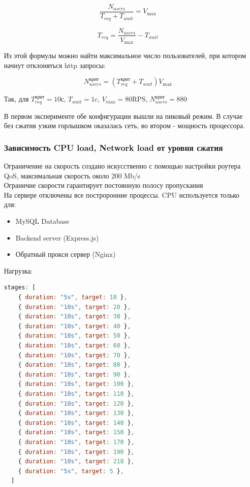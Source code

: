 \documentclass[12pt]{article}
\begin{document}
\[
    \frac{N_{users}}{T_{req} + T_{wait}}=V_{\text{max}}
\]

\[
    T_{req} = \frac{N_{users}}{V_{\text{max}}} - T_{wait}
\]

Из этой формулы можно найти максимальное число пользователей, при котором начнут отклоняться http запросы:

\begin{equation}
    N^{\text{крит}}_{users} = (T^{\text{крит}}_{req} + T_{wait}){V_{\text{max}}}
\end{equation}

Так, для $T^{\text{крит}}_{req} = 10$с, $T_{wait}=1$c, $V_{max}=80$RPS, $N^{\text{крит}}_{users}=880$

В первом эксперименте обе конфигурации вышли на пиковый режим. В случае без сжатия узким горлышком оказалась сеть, во втором - мощность процессора.

\subsubsection{Зависимость CPU load, Network load от уровня сжатия}

Ограничение на скорость создано искусственно с помощью настройки роутера QoS, максимальная скорость около 200 Mb/s\\
Ограничие скорости гарантирует постоянную полосу пропускания\\
На сервере отключены все построронние процессы. CPU используется только для:

\begin{itemize}
    \item MySQL Database
    \item Backend server (Express.js)
    \item Обратный прокси сервер (Nginx)
\end{itemize}

Нагрузка:

\begin{lstlisting}[language=JavaScript]
  stages: [
    { duration: "5s", target: 10 },
    { duration: "10s", target: 20 },
    { duration: "10s", target: 30 },
    { duration: "10s", target: 40 },
    { duration: "10s", target: 50 },
    { duration: "10s", target: 60 },
    { duration: "10s", target: 70 },
    { duration: "10s", target: 80 },
    { duration: "10s", target: 90 },
    { duration: "10s", target: 100 },
    { duration: "10s", target: 110 },
    { duration: "10s", target: 120 },
    { duration: "10s", target: 130 },
    { duration: "10s", target: 140 },
    { duration: "10s", target: 150 },
    { duration: "10s", target: 170 },
    { duration: "10s", target: 190 },
    { duration: "10s", target: 210 },
    { duration: "5s", target: 5 },
  ]
\end{lstlisting}
\end{document}
